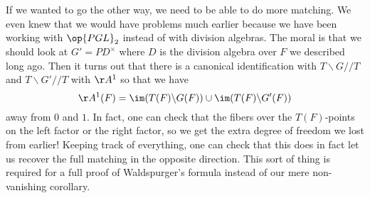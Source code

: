 \documentclass[../notes.tex]{subfiles}
\begin{document}
If we wanted to go the other way, we need to be able to do more matching. We even knew that we would have problems much earlier because we have been working with $\op{PGL}_2$ instead of with division algebras. The moral is that we should look at $G'=PD^\times$ where $D$ is the division algebra over $F$ we described long ago. Then it turns out that there is a canonical identification with $T\backslash G//T$ and $T\backslash G'//T$ with $\AA^1$ so that we have
\[\AA^1(F)=\im(T(F)\backslash G(F))\cup\im(T(F)\backslash G'(F))\]
away from $0$ and $1$. In fact, one can check that the fibers over the $T(F)$-points on the left factor or the right factor, so we get the extra degree of freedom we lost from earlier! Keeping track of everything, one can check that this does in fact let us recover the full matching in the opposite direction. This sort of thing is required for a full proof of Waldspurger's formula instead of our mere non-vanishing corollary.
\end{document}
